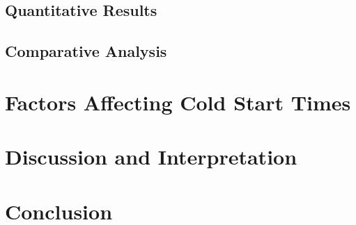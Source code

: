 \subsection{Quantitative Results}
\label{subsec:quantitative_results}

\subsection{Comparative Analysis}
\label{subsec:comparative_analysis}

\section{Factors Affecting Cold Start Times}
\label{sec:factors_affecting_cold_start_times}

\section{Discussion and Interpretation}
\label{sec:discussion_and_interpretation}

\section{Conclusion}
\label{sec:conclusion_cold_start_analysis}
